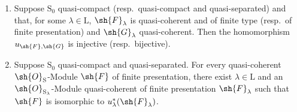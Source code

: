 \begin{theorem}[8.5.2]
\label{IV.8.5.2}
\begin{enumerate}[label=(\roman*)]
  \item Suppose $\mathrm{S}_0$ quasi-compact (resp.\ quasi-compact and quasi-separated) and that, for some $\lambda\in\mathrm{L}$, $\sh{F}_\lambda$ is quasi-coherent and of finite type (resp.\ of finite presentation) and $\sh{G}_\lambda$ quasi-coherent.
Then the homomorphism $u_{\sh{F},\sh{G}}$ is injective (resp.\ bijective).
  \item Suppose $\mathrm{S}_0$ quasi-compact and quasi-separated.
For every quasi-coherent $\sh{O}_\mathrm{S}$-Module $\sh{F}$ of finite presentation, there exist $\lambda\in\mathrm{L}$ and an $\sh{O}_{\mathrm{S}_\lambda}$-Module quasi-coherent of finite presentation $\sh{F}_\lambda$ such that $\sh{F}$ is isomorphic to $u_\lambda^*(\sh{F}_\lambda)$.
\end{enumerate}
\end{theorem}

